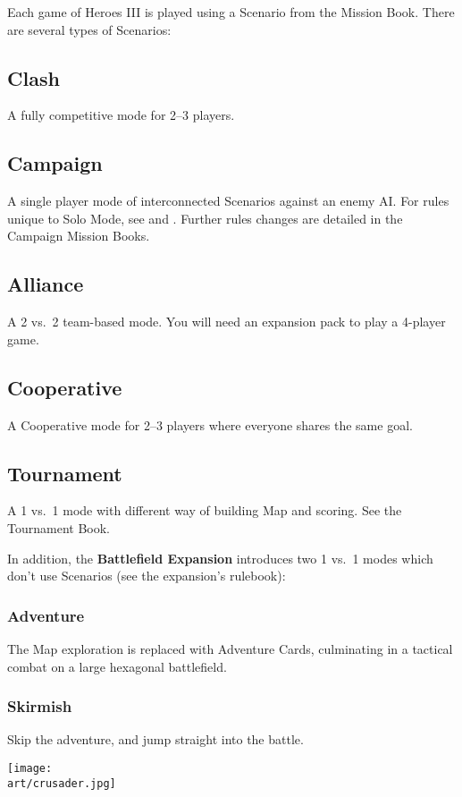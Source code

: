 
\begin{multicols*}{2}

Each game of Heroes III is played using a Scenario from the Mission Book.
There are several types of Scenarios:

\subsection*{Clash}
A fully competitive mode for 2--3 players.

\subsection*{Campaign}
A single player mode of interconnected Scenarios against an enemy AI.
For rules unique to Solo Mode, see  and .
Further rules changes are detailed in the Campaign Mission Books.

\subsection*{Alliance}
A 2 vs.~2 team-based mode.
You will need an expansion pack to play a 4-player game.

\subsection*{Cooperative}
A Cooperative mode for 2--3 players where everyone shares the same goal.

\subsection*{Tournament}
A 1 vs.~1 mode with different way of building Map and scoring. See the Tournament Book.

\begin{center}
\end{center}

\columnbreak

In addition, the \textbf{Battlefield Expansion} introduces two 1 vs.~1 modes which don't use Scenarios (see the expansion's rulebook):

\subsubsection*{Adventure}
The Map exploration is replaced with Adventure Cards, culminating in a tactical combat on a large hexagonal battlefield.

\subsubsection*{Skirmish}
Skip the adventure, and jump straight into the battle.

\bigskip
\vspace*{\fill}
\texttt{[image: \\art/crusader.jpg]}
\vspace*{\fill}

\end{multicols*}
